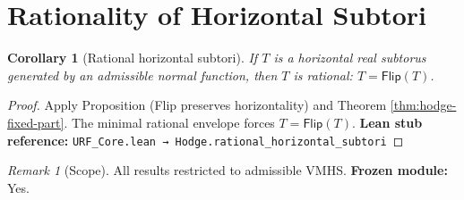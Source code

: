 \documentclass[11pt]{article}
\theoremstyle{plain}
\newtheorem{corollary}[theorem]{Corollary}
\theoremstyle{remark}
\newtheorem{remark}[theorem]{Remark}
\begin{document}
\section{Rationality of Horizontal Subtori}

\begin{corollary}[Rational horizontal subtori]\label{cor:hodge-rational}
If $T$ is a horizontal real subtorus generated by an admissible normal function, then $T$ is rational: $T = \mathsf{Flip}(T)$.
\end{corollary}

\begin{proof}
Apply Proposition (Flip preserves horizontality) and Theorem \ref{thm:hodge-fixed-part}.  
The minimal rational envelope forces $T = \mathsf{Flip}(T)$.  
\textbf{Lean stub reference:} \texttt{URF\_Core.lean → Hodge.rational\_horizontal\_subtori}
\end{proof}

\begin{remark}[Scope]
All results restricted to admissible VMHS.  
\textbf{Frozen module:} Yes.
\end{remark}
\end{document}
